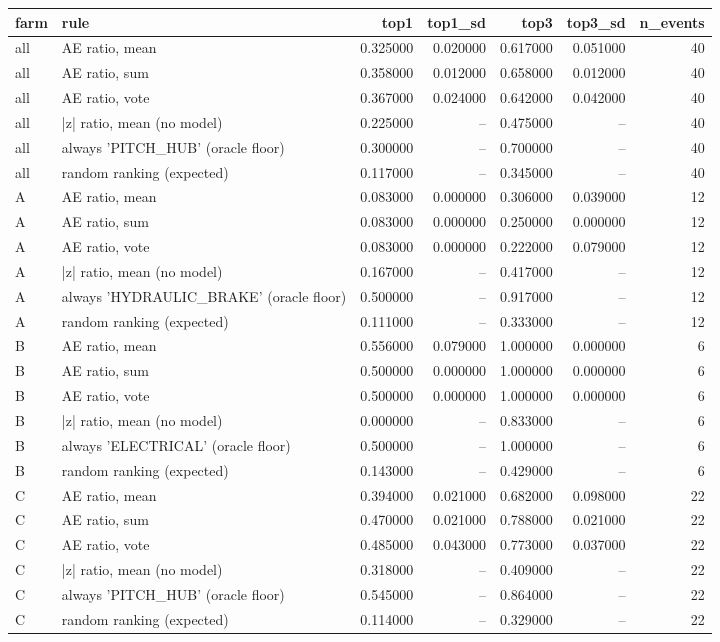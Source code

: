 \begin{tabular}{llrrrrr}
\toprule
farm & rule & top1 & top1_sd & top3 & top3_sd & n_events \\
\midrule
all & AE ratio, mean & 0.325000 & 0.020000 & 0.617000 & 0.051000 & 40 \\
all & AE ratio, sum & 0.358000 & 0.012000 & 0.658000 & 0.012000 & 40 \\
all & AE ratio, vote & 0.367000 & 0.024000 & 0.642000 & 0.042000 & 40 \\
all & |z| ratio, mean (no model) & 0.225000 & -- & 0.475000 & -- & 40 \\
all & always 'PITCH_HUB' (oracle floor) & 0.300000 & -- & 0.700000 & -- & 40 \\
all & random ranking (expected) & 0.117000 & -- & 0.345000 & -- & 40 \\
A & AE ratio, mean & 0.083000 & 0.000000 & 0.306000 & 0.039000 & 12 \\
A & AE ratio, sum & 0.083000 & 0.000000 & 0.250000 & 0.000000 & 12 \\
A & AE ratio, vote & 0.083000 & 0.000000 & 0.222000 & 0.079000 & 12 \\
A & |z| ratio, mean (no model) & 0.167000 & -- & 0.417000 & -- & 12 \\
A & always 'HYDRAULIC_BRAKE' (oracle floor) & 0.500000 & -- & 0.917000 & -- & 12 \\
A & random ranking (expected) & 0.111000 & -- & 0.333000 & -- & 12 \\
B & AE ratio, mean & 0.556000 & 0.079000 & 1.000000 & 0.000000 & 6 \\
B & AE ratio, sum & 0.500000 & 0.000000 & 1.000000 & 0.000000 & 6 \\
B & AE ratio, vote & 0.500000 & 0.000000 & 1.000000 & 0.000000 & 6 \\
B & |z| ratio, mean (no model) & 0.000000 & -- & 0.833000 & -- & 6 \\
B & always 'ELECTRICAL' (oracle floor) & 0.500000 & -- & 1.000000 & -- & 6 \\
B & random ranking (expected) & 0.143000 & -- & 0.429000 & -- & 6 \\
C & AE ratio, mean & 0.394000 & 0.021000 & 0.682000 & 0.098000 & 22 \\
C & AE ratio, sum & 0.470000 & 0.021000 & 0.788000 & 0.021000 & 22 \\
C & AE ratio, vote & 0.485000 & 0.043000 & 0.773000 & 0.037000 & 22 \\
C & |z| ratio, mean (no model) & 0.318000 & -- & 0.409000 & -- & 22 \\
C & always 'PITCH_HUB' (oracle floor) & 0.545000 & -- & 0.864000 & -- & 22 \\
C & random ranking (expected) & 0.114000 & -- & 0.329000 & -- & 22 \\
\bottomrule
\end{tabular}

